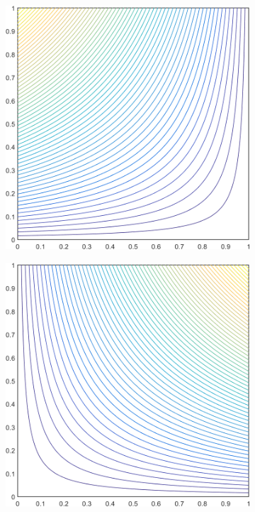 \begin{figure}
\label{fig::2D_MAXENT1_unit_square_basis_functions}
\centering
	\begin{subfigure}[b]{0.39\textwidth}
		\centering
		\includegraphics[width=\textwidth]{figures/sec_BF/square_MAXENT1_contour_b4.png}
		\caption{}
	\end{subfigure}
	\hspace{1.5cm}
	\begin{subfigure}[b]{0.39\textwidth}
		\centering
		\includegraphics[width=\textwidth]{figures/sec_BF/square_MAXENT1_contour_b3.png}

\end{subfigure}
\end{figure}
